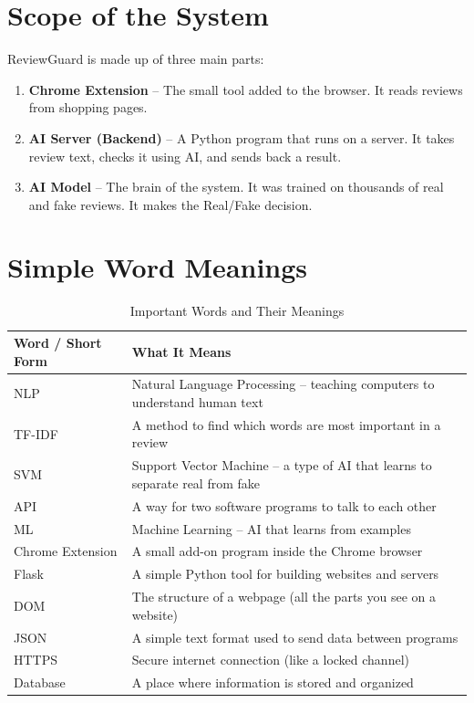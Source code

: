 \documentclass[10pt, a4paper]{report}
\begin{document}
\section{Scope of the System}

ReviewGuard is made up of three main parts:
\begin{enumerate}
  \item \textbf{Chrome Extension} -- The small tool added to the browser. It reads reviews from shopping pages.
  \item \textbf{AI Server (Backend)} -- A Python program that runs on a server. It takes review text, checks it using AI, and sends back a result.
  \item \textbf{AI Model} -- The brain of the system. It was trained on thousands of real and fake reviews. It makes the Real/Fake decision.
\end{enumerate}

\section{Simple Word Meanings}

\begin{table}[H]
\centering
\caption{Important Words and Their Meanings}
\begin{tabular}{ll}
\toprule
\textbf{Word / Short Form} & \textbf{What It Means} \\
\midrule
NLP & Natural Language Processing -- teaching computers to understand human text \\
TF-IDF & A method to find which words are most important in a review \\
SVM & Support Vector Machine -- a type of AI that learns to separate real from fake \\
API & A way for two software programs to talk to each other \\
ML & Machine Learning -- AI that learns from examples \\
Chrome Extension & A small add-on program inside the Chrome browser \\
Flask & A simple Python tool for building websites and servers \\
DOM & The structure of a webpage (all the parts you see on a website) \\
JSON & A simple text format used to send data between programs \\
HTTPS & Secure internet connection (like a locked channel) \\
Database & A place where information is stored and organized \\
\bottomrule
\end{tabular}
\end{table}
\end{document}
